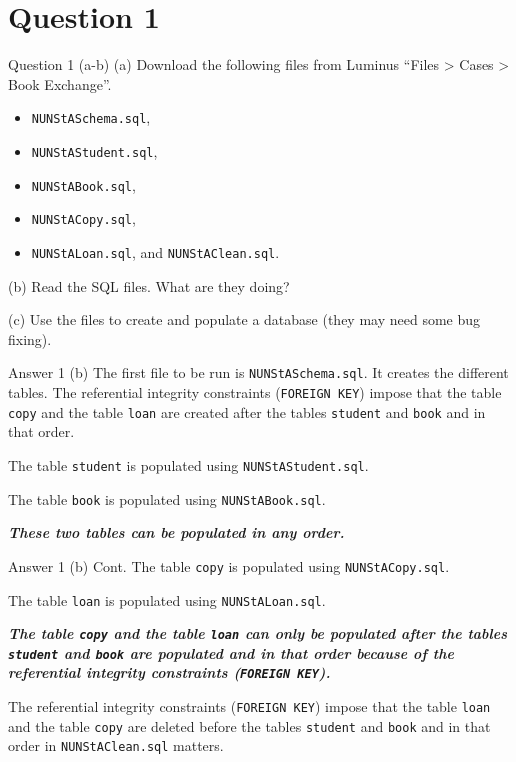 \section*{Question 1}

\begin{frame}{Question 1 (a-b)}
    (a) Download the following files from Luminus ``Files > Cases > Book Exchange''.
			\begin{itemize}
				\item[] \texttt{NUNStASchema.sql},
				\item[] \texttt{NUNStAStudent.sql},
				\item[] \texttt{NUNStABook.sql},
				\item[] \texttt{NUNStACopy.sql},
				\item[] \texttt{NUNStALoan.sql}, and \texttt{NUNStAClean.sql}.
			\end{itemize}
			
    (b) Read the SQL files. What are they doing? 
    
    (c) Use the files to create and populate a database (they may need some bug fixing).
\end{frame}

\begin{frame}{Answer 1 (b)}
	The first file to be run is \texttt{NUNStASchema.sql}. It creates the different tables. The referential integrity constraints (\texttt{FOREIGN KEY}) impose that the table \texttt{copy} and the table \texttt{loan} are created after the tables \texttt{student} and \texttt{book} and in that order.
	
	The table \texttt{student} is populated using \texttt{NUNStAStudent.sql}. 
	
	The table \texttt{book} is populated using \texttt{NUNStABook.sql}. 
	
	\textbf{\textit{These two tables can be populated in any order.}} 
\end{frame}

\begin{frame}{Answer 1 (b) Cont.}
	The table \texttt{copy} is populated using \texttt{NUNStACopy.sql}. 
	
	The table \texttt{loan} is populated using \texttt{NUNStALoan.sql}. 
	
	\textit{\textbf{The table \texttt{copy} and the table \texttt{loan} can only be populated after the tables \texttt{student} and \texttt{book} are populated and in that order because of the referential integrity constraints (\texttt{FOREIGN KEY}).} }
	
	The referential integrity constraints (\texttt{FOREIGN KEY}) impose that the table \texttt{loan} and the table \texttt{copy} are deleted before the tables \texttt{student} and \texttt{book} and in that order in \texttt{NUNStAClean.sql} matters.
\end{frame}

